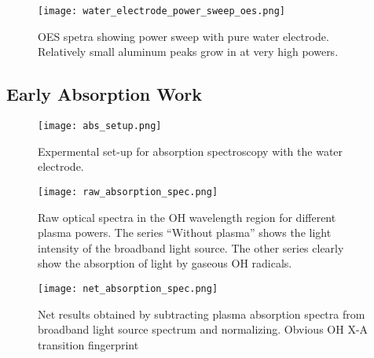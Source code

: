 \begin{figure}[htbp]
  \centering
  \texttt{[image: water\_electrode\_power\_sweep\_oes.png]}
  \caption{OES spetra showing power sweep with pure water electrode. Relatively small aluminum peaks grow in at very high powers.}
  \label{fig:pow_sweep_water}
\end{figure}


\subsection{Early Absorption Work}

\begin{figure}[htbp]
  \centering
  \texttt{[image: abs\_setup.png]}
  \caption{Expermental set-up for absorption spectroscopy with the water electrode.}
  \label{fig:expt_abs}
\end{figure}

\begin{figure}[htbp]
  \centering
  \texttt{[image: raw\_absorption\_spec.png]}
  \caption{Raw optical spectra in the OH wavelength region for different plasma powers. The series ``Without plasma'' shows the light intensity of the broadband light source. The other series clearly show the absorption of light by gaseous OH radicals.}
  \label{fig:raw_abs}
\end{figure}

\begin{figure}[htbp]
  \centering
  \texttt{[image: net\_absorption\_spec.png]}
  \caption{Net results obtained by subtracting plasma absorption spectra from broadband light source spectrum and normalizing. Obvious OH X-A transition fingerprint}
  \label{fig:net_abs}
\end{figure}

